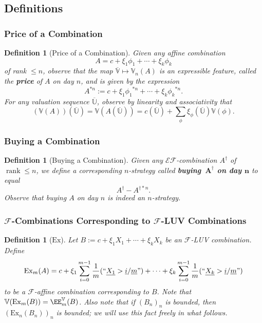 \documentclass[authordate,onecolumn,noenvironments]{miri-tech-article}
\newtheorem{definition}[theorem]{Definition}
\numberwithin{equation}{subsection}
\newcommand{\quot}[1]{``#1"}
\newcommand{\enc}[1]{{\underline{#1}}}
\newcommand{\seq}[1]{{\overline{#1}}}
\newcommand{\affconst}{c}
\newcommand{\exf}{\xi}
\newcommand{\rank}{\operatorname{rank}}
\newcommand{\nn}{n}
\newcommand{\features}{\mathcal{F}} %
\newcommand{\exfeatures}{\mathcal{E\!F}} %
\newcommand{\aff}{A}
\newcommand{\affluv}{B} %
\newcommand{\alta}{\mathrm{Ex}} %
\newcommand{\gens}{\dagger}
\newcommand{\Valuation}{\mathbb{V}}
\renewcommand{\UU}{\mathbb{U}} %
\newcommand{\pf}[2][\nn]{{#2}^{*#1}}
\begin{document}
%
%
%
%
%
%
%
%
%
%
%
%
%
%
%
%
%


\subsection{Definitions}

\subsubsection{Price of a Combination}

\begin{definition}[Price of a Combination]
\noindent Given any affine combination 
  \[
    \aff =
    \affconst
      + \exf_1\phi_1
      + \cdots
      + \exf_k\phi_k
  \]
of rank $\leq n$, observe that the map $\seq\Valuation \mapsto \Valuation_\nn(\aff)$ is an expressible feature, called the \textbf{price} of $\aff$ on day $\nn$, and is given by the expression 
  \[
    \pf{\aff} :=
    \affconst
      + \exf_1\pf{\phi_1}
      + \cdots
      + \exf_k\pf{\phi_k}.
  \]
\noindent For any valuation sequence $\seq\UU$, observe by linearity and associativity that
\[(\Valuation(\aff))(\seq \UU) = \Valuation(\aff(\seq \UU)) = \affconst(\seq\UU) + \sum_\phi \exf_\phi(\seq\UU)\Valuation(\phi) . \]
\end{definition}

\subsubsection{Buying a Combination}

\begin{definition}[Buying a Combination]  Given any $\exfeatures$-combination  $\aff^\gens$ of $\rank \leq \nn$, we define a corresponding $n$-strategy called \textbf{buying~$\bm{\aff^\gens}$ on day $\bm \nn$} to equal
  \[
     \aff^\gens - \aff^{\gens * n}.
  \]
Observe that buying $\aff$ on day $\nn$ is indeed an $\nn$-strategy.  
\end{definition}


\subsubsection{$\features$-Combinations Corresponding to $\features$-LUV Combinations}\label{app:featureluvcombos}

\begin{definition}[$\alta$]
  Let $\affluv := \affconst + \exf_1 X_1 + \cdots + \exf_k X_k$ be an $\features$-LUV combination.
  Define 
  \[ \alta_m(\aff) = \affconst + \exf_1 \sum_{i=0}^{m-1} \frac{1}{m} (\quot{\enc{X_1} > \enc{i}/\enc{m}}) + \cdots + \exf_k \sum_{i=0}^{m-1} \frac{1}{m} (\quot{\enc{X_k} > \enc{i}/\enc{m}}) \]
  to be a $\features$-affine combination corresponding to $\affluv$.  Note that $\Valuation(\alta_m(\affluv)) = \EE_m^\Valuation(\affluv)$. Also note that if $(\affluv_\nn)_n$ is bounded, then  $(\alta_n(\affluv_\nn))_n$ is bounded; we will use this fact freely in what follows.
\end{definition}
\end{document}

